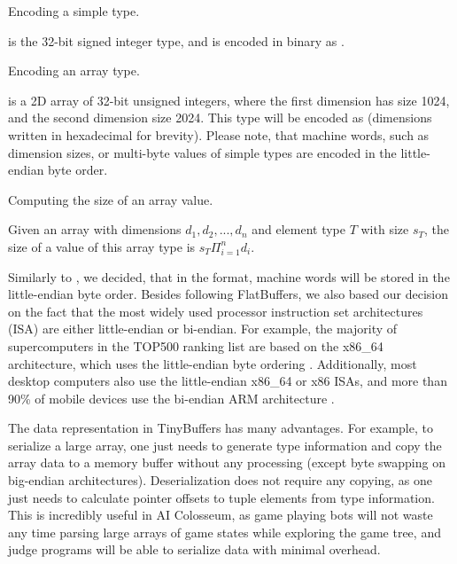 \begin{example}
\caption{Encoding a simple type.}
\label{ex:simple_type}
 is the 32-bit signed integer type, and is encoded in binary as .
\end{example}

\begin{example}
\caption{Encoding an array type.}
\label{ex:array_type}
 is a 2D array of 32-bit unsigned integers, where the first dimension has size 1024, and the second dimension size 2024. This type will be encoded as  (dimensions written in hexadecimal for brevity). Please note, that machine words, such as dimension sizes, or multi-byte values of simple types are encoded in the little-endian byte order.
\end{example}

\begin{example}
\caption{Computing the size of an array value.}
\label{ex:array_size}
Given an array with dimensions $d_1, d_2, ..., d_n$ and element type $T$ with size $s_T$, the size of a value of this array type is $s_T \Pi_{i=1}^n d_i$.
\end{example}

Similarly to , we decided, that in the  format, machine words will be stored in the little-endian byte order. Besides following FlatBuffers, we also based our decision on the fact that the most widely used processor instruction set architectures (ISA) are either little-endian or bi-endian. For example, the majority of supercomputers in the TOP500 ranking list are based on the x86\_64 architecture, which uses the little-endian byte ordering \cite{top500} \cite{top500isa}. Additionally, most desktop computers also use the little-endian x86\_64 or x86 ISAs, and more than 90\% of mobile devices use the bi-endian ARM architecture \cite{arm_investors}.

The data representation in TinyBuffers has many advantages. For example, to serialize a large array, one just needs to generate type information and copy the array data to a memory buffer without any processing (except byte swapping on big-endian architectures). Deserialization does not require any copying, as one just needs to calculate pointer offsets to tuple elements from type information. This is incredibly useful in AI Colosseum, as game playing bots will not waste any time parsing large arrays of game states while exploring the game tree, and judge programs will be able to serialize data with minimal overhead.

